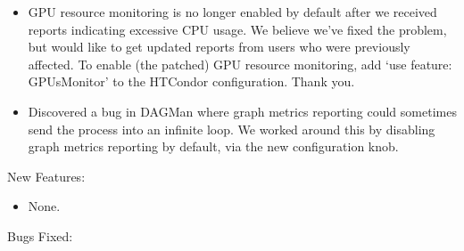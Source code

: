 \begin{itemize}

\item GPU resource monitoring is no longer enabled by default after we
received reports indicating excessive CPU usage.  We believe we've fixed
the problem, but would like to get updated reports from users who were
previously affected.  To enable (the patched) GPU resource monitoring,
add `use feature: GPUsMonitor' to the HTCondor configuration.  Thank you.


\item Discovered a bug in DAGMan where graph metrics reporting could sometimes 
send the  process into an infinite loop. We worked around this 
by disabling graph metrics reporting by default, via the new  
 configuration knob.

\end{itemize}


\noindent New Features:

\begin{itemize}

\item None.

\end{itemize}

\noindent Bugs Fixed:


